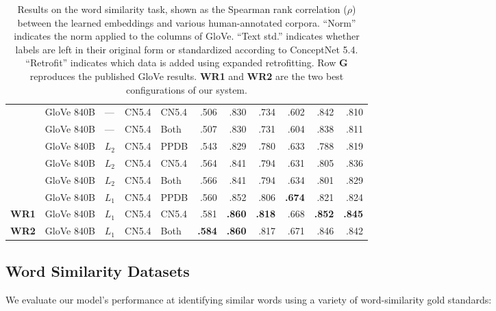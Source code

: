 \documentclass[11pt,letterpaper]{article}
\begin{document}
\begin{table*}[t]
\begin{tabular}{lllllrrrrrr}
       &GloVe 840B   & ---   & CN5.4     & CN5.4    &     .506 &     .830 &      .734 &      .602 &     .842 &     .810 \\
       &GloVe 840B   & ---   & CN5.4     & Both     &     .507 &     .830 &      .731 &      .604 &     .838 &     .811 \\
       &GloVe 840B   & $L_2$ & CN5.4     & PPDB     &     .543 &     .829 &      .780 &      .633 &     .788 &     .819 \\
       &GloVe 840B   & $L_2$ & CN5.4     & CN5.4    &     .564 &     .841 &      .794 &      .631 &     .805 &     .836 \\
       &GloVe 840B   & $L_2$ & CN5.4     & Both     &     .566 &     .841 &      .794 &      .634 &     .801 &     .829 \\
       &GloVe 840B   & $L_1$ & CN5.4     & PPDB     &     .560 &     .852 &      .806 & {\bf .674}&     .821 &     .824 \\
\bf WR1&GloVe 840B   & $L_1$ & CN5.4     & CN5.4    &     .581 &{\bf .860}& {\bf .818}&      .668 &{\bf .852}&{\bf .845}\\
\bf WR2&GloVe 840B   & $L_1$ & CN5.4     & Both     &{\bf .584}&{\bf .860}&      .817 &      .671 &     .846 &     .842 \\
\bottomrule
\end{tabular}

\caption{
    Results on the word similarity task, shown as the Spearman rank correlation
    ($\rho$) between the learned embeddings and various human-annotated corpora.
    ``Norm'' indicates the norm applied to the columns of GloVe.
    ``Text std.'' indicates whether labels are left in their original form or
    standardized according to ConceptNet 5.4. ``Retrofit'' indicates which data
    is added using expanded retrofitting.
    Row {\bf G} reproduces the published GloVe results.
    {\bf WR1} and {\bf WR2} are the two best configurations of our system.
}
\label{eval-bigtable}
\end{table*}

\subsection{Word Similarity Datasets}

We evaluate our model's performance at identifying similar words using a
variety of word-similarity gold standards:
\end{document}
